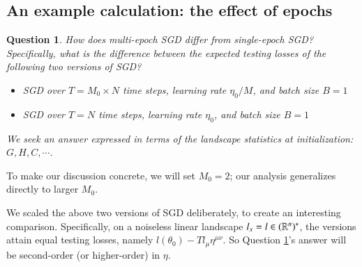 \documentclass[final,12pt]{colt2021} %
\newtheorem{quest}{Question}
\begin{document}
    \subsection{An example calculation: the effect of epochs}       \label{appendix:example}

        \begin{quest}\label{qst:multi}
            How does multi-epoch SGD differ from single-epoch SGD?
            Specifically, what is the difference between the expected
            testing losses of the following two versions of SGD?
            \begin{itemize}
                \item SGD over $T=M_0 \times N$ time steps, learning rate $\eta_0/M$, and
                    batch size $B=1$
                \item SGD over $T=N$ time steps, learning rate $\eta_0$, and batch size $B=1$
            \end{itemize}
            We seek an answer expressed in terms of the landscape statistics
            at initialization: $G,H,C, \cdots$.
        \end{quest}
        To make our discussion concrete, we will set $M_0=2$; our analysis 
        generalizes directly to larger $M_0$.

        We scaled the above two versions of SGD deliberately, to create an
        interesting comparison.
        Specifically, on a noiseless
        linear landscape $l_x=l \in (\mathbb{R}^n)^*$, the versions
        attain equal testing losses, namely $l(\theta_0) - T l_\mu \eta^{\mu\nu}$.
        So Question \ref{qst:multi}'s answer will be second-order (or
        higher-order) in $\eta$.
\end{document}

